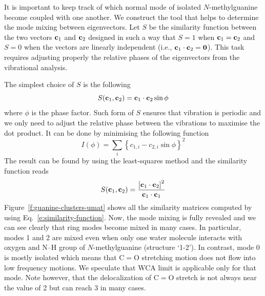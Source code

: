 \documentclass[a4paper,titlepage,twoside,fleqn,12pt]{book}
\begin{document}
\begin{refsection}
It is important to keep track of which normal mode of isolated
$N$-methylguanine become coupled with one another.
We construct the tool that helps to determine
the mode mixing between eigenvectors.
Let $S$ be the similarity function between the two
vectors ${\bf c}_1$ and ${\bf c}_2$ designed in such a way that
$S=1$ when ${\bf c}_1={\bf c}_2$ and $S=0$ when the vectors
are linearly independent (i.e., ${\bf c}_1\cdot {\bf c}_2={\bf 0}$).
This task requires adjusting properly the relative phases
of the eigenvectors from the vibrational analysis.

The simplest choice of $S$ is the following
%
\begin{equation}  
  S({\bf c}_1,{\bf c}_2) = {\bf c}_1\cdot {\bf c}_2 \sin{\phi}
\end{equation}
%
where $\phi$ is the phase factor. Such form of $S$ ensures that
vibration is periodic and we only need to adjust the relative phase
between the vibrations to maximise the dot product.
It can be done by minimising the following function
%
\begin{equation}  
  I(\phi) = \sum_i \left\{ c_{1,i} - c_{2,i} \sin{\phi}\right\}^2
\end{equation}
%
The result can be found by using the least\hyp{}squares method
and the similarity function reads
%
\begin{equation}  \label{e:similarity-function}
  S({\bf c}_1,{\bf c}_2) = \frac{ \left[{\bf c}_1\cdot {\bf c}_2 \right]^2}{{\bf c}_1\cdot {\bf c}_1}
\end{equation}
%
Figure~\ref{f:guanine-clusters-umat} shows all the similarity
matrices computed by using Eq.~\eqref{e:similarity-function}. 
Now, the mode mixing is fully revealed and
we can see clearly that ring modes become mixed in many cases. 
In particular,
modes 1 and 2 are mixed even when only one water molecule
interacts with oxygen and N--H group of $N$-methylguanine (structure
`1-2'). In contrast, mode 0 is mostly
isolated which means that C$=$O stretching motion does not flow into
low frequency motions. We speculate that WCA limit is applicable only for that
mode. Note however, that the delocalization of C$=$O stretch is not always
near the value of 2 but can reach 3 in many cases. 
%
\begin{figure}[t!]
\centering
\setlength\fboxsep{0.4pt}
\setlength\fboxrule{0.5pt}
\fbox{
}
\end{figure}
\end{refsection}
\end{document}

